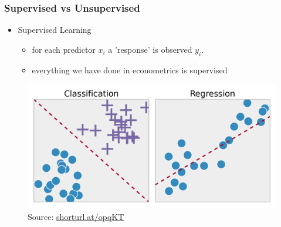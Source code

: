 \documentclass[
  shownotes,
  xcolor={svgnames},
  hyperref={colorlinks,citecolor=DarkBlue,linkcolor=DarkRed,urlcolor=DarkBlue}
  ]{beamer}
\begin{document}
\begin{frame}
\frametitle{Supervised vs Unsupervised}


\begin{itemize}
  \item Supervised Learning
  \begin{itemize}
    \item for each predictor $x_i$ a 'response' is observed $y_i$.
    \item everything we have done in econometrics is supervised
  \end{itemize}
\end{itemize}

\bigskip
\begin{figure}[H] \centering
  \captionsetup{justification=centering}

    \centering
    \includegraphics[scale=0.15]{figures/supevised}
  \\
  \tiny
  Source: \url{shorturl.at/opqKT}
  \end{figure}

\end{frame}
\end{document}
